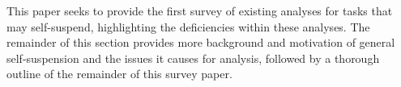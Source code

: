 This paper seeks to provide the first survey of existing analyses for tasks that may self-suspend, highlighting the deficiencies within these analyses. The remainder of this section provides more background and motivation of general self-suspension and the issues it causes for analysis, followed by a thorough outline of the remainder of this survey paper.




